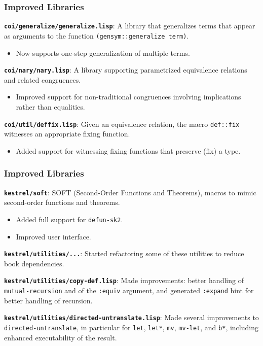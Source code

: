 \documentclass{beamer}
\newcommand{\code}[1]{\texttt{#1}}
\newcommand{\bookpath}[1]{\textbf{\code{#1}}}
\newcommand{\implibtitle}{\frametitle{Improved Libraries}}
\newcommand{\separation}{\vspace*{1ex}}
\begin{document}

\begin{frame}

\implibtitle

\bookpath{coi/generalize/generalize.lisp}:
A library that generalizes terms that appear as arguments to the
function \code{(gensym::generalize term)}.
\begin{itemize}
\item
Now supports one-step generalization of multiple terms.
\end{itemize}

\separation

\bookpath{coi/nary/nary.lisp}:
A library supporting parametrized equivalence relations and related congruences.
\begin{itemize}
\item
Improved support for non-traditional congruences involving
implications rather than equalities.
\end{itemize}

\separation

\bookpath{coi/util/deffix.lisp}:
Given an equivalence relation, the macro \code{def::fix} witnesses an
appropriate fixing function.
\begin{itemize}
\item
Added support for witnessing fixing functions that preserve (fix) a type.
\end{itemize}

\end{frame}


\begin{frame}

\implibtitle

\bookpath{kestrel/soft}:
SOFT (Second-Order Functions and Theorems),
macros to mimic second-order functions and theorems.
\begin{itemize}
\item
Added full support for \code{defun-sk2}.
\item
Improved user interface.
\end{itemize}

\separation

\bookpath{kestrel/utilities/...}:
Started refactoring some of these utilities to reduce book dependencies.

\separation

\bookpath{kestrel/utilities/copy-def.lisp}:
Made improvements: better handling of \code{mutual-recursion} and of
the \code{:equiv} argument, and generated \code{:expand} hint for better
handling of recursion.

\separation

\bookpath{kestrel/utilities/directed-untranslate.lisp}:
Made several improvements to \code{directed-untranslate}, in particular
for \code{let}, \code{let*}, \code{mv}, \code{mv-let}, and \code{b*},
including enhanced executability of the result.

\end{frame}
\end{document}
